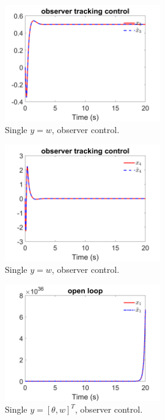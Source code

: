 \documentclass[12pt]{article}
\numberwithin{equation}{section}
\begin{document}
\begin{figure}[!ht]
    \centering
    \includegraphics[width=0.6\textwidth]{single_output_observer/fig11.png}
    \caption{Single $y = w$, observer control.}
\end{figure}

\begin{figure}[!ht]
    \centering
    \includegraphics[width=0.6\textwidth]{single_output_observer/fig12.png}
    \caption{Single $y = w$, observer control.}
\end{figure}

\begin{figure}[!ht]
    \centering
    \includegraphics[width=0.6\textwidth]{double_output_observer/fig1.png}
    \caption{Single $y = [\theta,w]^T$, observer control.}
\end{figure}
\end{document}
